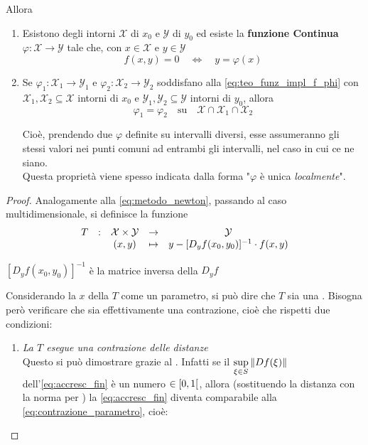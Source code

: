 \begin{theorem}
	Allora
	\begin{enumerate}
		\item Esistono degli intorni $\mathcal{X}$ di $x_0$ e $\mathcal{Y}$ di $y_0$ ed esiste la \textbf{funzione Continua} $\varphi: \mathcal{X} \to \mathcal{Y}$ tale che, con $x \in \mathcal{X}$ e $y \in \mathcal{Y}$
			\begin{equation}
				\label{eq:teo_funz_impl_f_phi}
				f(x,y) = 0 \quad \iff \quad y = \varphi(x)
			\end{equation}
		\item \label{itm:tesi_funz_impl_1} Se $\varphi_1: \mathcal{X}_1 \to \mathcal{Y}_1$ e $\varphi_2: \mathcal{X}_2 \to \mathcal{Y}_2$ soddisfano alla \cref{eq:teo_funz_impl_f_phi} con $\mathcal{X}_1, \mathcal{X}_2 \subseteq \mathcal{X}$ intorni di $x_0$ e $\mathcal{Y}_1, \mathcal{Y}_2 \subseteq \mathcal{Y}$ intorni di $y_0$, allora
			\[\varphi_1 = \varphi_2 \quad \text{su} \quad \mathcal{X} \cap \mathcal{X}_1 \cap \mathcal{X}_2\]
			\vspace*{-1.5\baselineskip}
			\begin{note}
				Cioè, prendendo due $\varphi$ definite su intervalli diversi, esse assumeranno gli stessi valori nei punti comuni ad entrambi gli intervalli, nel caso in cui ce ne siano.\\
				Questa proprietà viene spesso indicata dalla forma "$\varphi$ è unica \textit{localmente}".
			\end{note}
	\end{enumerate}
	\begin{proof}
		Analogamente alla \cref{eq:metodo_newton}, passando al caso multidimensionale, si definisce la funzione
		\begin{equation}
			\label{eq:funz_impl_T}
			\begin{array}{ccccc} {T} & : & {\mathcal{X} \times \mathcal{Y}} & \to & {\mathcal{Y}} \\ & & {(x,y)} & \mapsto & {y - [D_yf(x_0, y_0)]^{-1} \cdot f(x, y)} \\ \end{array}
		\end{equation}
		\begin{note}
			$[D_yf(x_0, y_0)]^{-1}$ è la matrice inversa della $D_yf$
		\end{note}
		Considerando la $x$ della $T$ come un parametro, si può dire che $T$ sia una . Bisogna però verificare che sia effettivamente una contrazione, cioè che rispetti due condizioni:
		\begin{enumerate}
			\item \textit{La $T$ esegue una contrazione delle distanze}\\
				Questo si può dimostrare grazie al . Infatti se il $\sup\limits_{\xi \in S} \left\|Df(\xi)\right\|$ dell'\cref{eq:accresc_fin} è un numero $\in \left[0,1\right[$, allora (sostituendo la distanza con la norma per ) la \cref{eq:accresc_fin} diventa comparabile alla \cref{eq:contrazione_parametro}, cioè:

\end{enumerate}
\end{proof}
\end{theorem}
